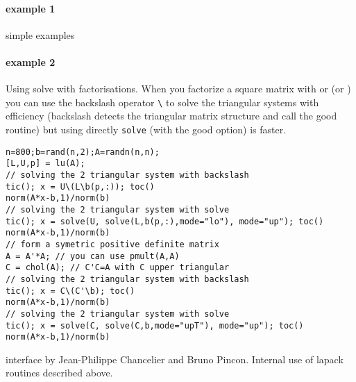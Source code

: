 \begin{examples}
\paragraph{example 1} simple examples
  \begin{program}
  \end{program}

\paragraph{example 2} Using solve with factorisations. When you factorize a square 
matrix with  or  (or ) you can
use the backslash operator \verb+\+ to solve the triangular systems with efficiency
(backslash detects the triangular matrix structure and call the good routine) but 
using directly \verb+solve+ (with the good option) is faster.
  \begin{Verbatim}
n=800;b=rand(n,2);A=randn(n,n);
[L,U,p] = lu(A); 
// solving the 2 triangular system with backslash
tic(); x = U\(L\b(p,:)); toc()
norm(A*x-b,1)/norm(b) 
// solving the 2 triangular system with solve
tic(); x = solve(U, solve(L,b(p,:),mode="lo"), mode="up"); toc()
norm(A*x-b,1)/norm(b) 
// form a symetric positive definite matrix
A = A'*A; // you can use pmult(A,A)
C = chol(A); // C'C=A with C upper triangular  
// solving the 2 triangular system with backslash
tic(); x = C\(C'\b); toc()
norm(A*x-b,1)/norm(b) 
// solving the 2 triangular system with solve
tic(); x = solve(C, solve(C,b,mode="upT"), mode="up"); toc()
norm(A*x-b,1)/norm(b)
  \end{Verbatim}

\end{examples}

\begin{authors}
   interface by Jean-Philippe Chancelier and Bruno Pincon. Internal use of lapack 
   routines described above.
\end{authors}
